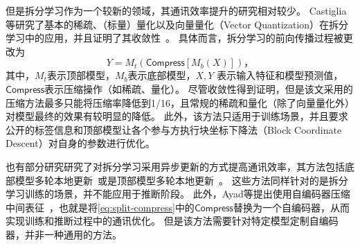 %
但是拆分学习作为一个较新的领域，其通讯效率提升的研究相对较少。
%
Castiglia等研究了基本的稀疏、（标量）量化以及向量量化（Vector Quantization）在拆分学习中的应用，并且证明了其收敛性~\cite{castiglia2022compressed_vfl}。
%
具体而言，拆分学习的前向传播过程被更改为
\begin{equation}
\label{eq:split-compress}
    Y = M_t(\mathsf{Compress}[M_b(X)])，
\end{equation}
%
其中，$M_t$表示顶部模型，$M_b$表示底部模型，$X, Y$ 表示输入特征和模型预测值，$\mathsf{Compress}$表示压缩操作（如稀疏、量化）。
%
尽管收敛性得到证明，但是该文采用的压缩方法最多只能将压缩率降低到1/16，且常规的稀疏和量化（除了向量量化外）对模型最终的效果有较明显的降低。
%
此外，该方法只适用于训练场景，并且要求公开的标签信息和顶部模型让各个参与方执行块坐标下降法（Block Coordinate Descent）对自身的参数进行优化。

也有部分研究研究了对拆分学习采用异步更新的方式提高通讯效率，其方法包括底部模型多轮本地更新~\cite{fu2022cache_vfl}或是顶部模型多轮本地更新~\cite{chen2021async_split}。
%
这些方法同样针对的是拆分学习训练的场景，并不能应用于推断阶段。
%
此外，Ayad等提出使用自编码器压缩中间表征~\cite{ayad202vfl}，也就是将\eqref{eq:split-compress}中的$\mathsf{Compress}$替换为一个自编码器，从而实现训练和推断过程中的通讯优化。
%
但是该方法需要针对特定模型定制自编码器，并非一种通用的方法。